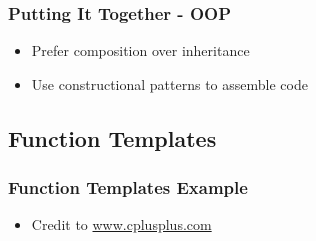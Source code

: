 \hypertarget{putting-it-together---oop}{%
\subsubsection{Putting It Together -
OOP}\label{putting-it-together---oop}}

\begin{itemize}
\tightlist
\item
  Prefer composition over inheritance
\item
  Use constructional patterns to assemble code
\end{itemize}

\hypertarget{function-templates}{%
\subsection{Function Templates}\label{function-templates}}

\hypertarget{function-templates-example}{%
\subsubsection{Function Templates
Example}\label{function-templates-example}}

\begin{itemize}
\tightlist
\item
  Credit to
  \href{http://www.cplusplus.com/doc/tutorial/functions2}{www.cplusplus.com}
\end{itemize}

\begin{Shaded}
\begin{Highlighting}[]
 

\NormalTok{ <}
\NormalTok{\{}
\NormalTok{\}}

  \NormalTok{;}
  \NormalTok{;}
\NormalTok{;}
\NormalTok{;}
   \NormalTok{;}
\NormalTok{\}}
\end{Highlighting}
\end{Shaded}

